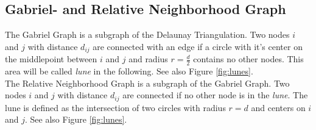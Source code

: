 
\subsection{Gabriel- and Relative Neighborhood Graph}
\label{ssec:graphtypes}
    The Gabriel Graph \cite{Gabriel1969} is a subgraph of the
    Delaunay Triangulation. Two nodes \(i\) and \(j\) with distance
    \(d_{ij}\) are connected with an edge if a circle with it's
    center on the middlepoint between \(i\) and \(j\) and radius
    \(r = \frac d 2\) contains no other nodes. This area will be
    called \emph{lune} in the following. See also Figure
    \ref{fig:lunes}.\\
    The Relative Neighborhood Graph \cite{Toussaint1980} is a
    subgraph of the Gabriel Graph. Two nodes \(i\) and \(j\) with
    distance \(d_{ij}\) are connected if no other node is in the
    \emph{lune}. The lune is defined as the intersection of two
    circles with radius \(r = d\) and centers on \(i\) and \(j\).
    See also Figure \ref{fig:lunes}.
